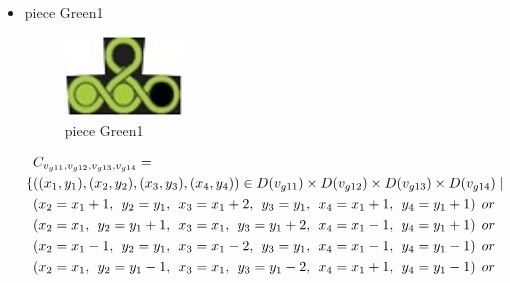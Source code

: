 \begin{appendices}
\begin{itemize}
\begin{align*}
\end{align*}
 \item piece Green1\\
\begin{figure}[H]
    \centering
    \includegraphics[width=0.3\textwidth]{figs/green1.jpg}
    \caption{piece Green1}
\end{figure}
 \begin{align*}
&\Const{g11}{g12}{g13}{g14}=
\\\{&((x_{1},y_{1}),(x_{2},y_{2}),(x_{3},y_{3}),(x_{4},y_{4}))\in \Domain{g11}\times \Domain{g12}\times\Domain{g13}\times\Domain{g14}\mid\\
&(x_{2} = x_{1} + 1,\hspace{1ex}y_{2} = y_{1},\hspace{1ex}x_{3} = x_{1} + 2, \hspace{1ex}y_{3} = y_{1},\hspace{1ex}x_{4} = x_{1}+1,\hspace{1ex}y_{4} = y_{1}+1)\hspace{1ex} or\\
&(x_{2} = x_{1},\hspace{1ex}y_{2} = y_{1}+1,\hspace{1ex}x_{3} = x_{1}, \hspace{1ex}y_{3} = y_{1}+2,\hspace{1ex}x_{4} = x_{1}-1,\hspace{1ex}y_{4} = y_{1}+1)\hspace{1ex} or\\
&(x_{2} = x_{1}-1,\hspace{1ex}y_{2} = y_{1},\hspace{1ex}x_{3} = x_{1}-2,\hspace{1ex} y_{3} = y_{1},\hspace{1ex}x_{4} = x_{1}-1,\hspace{1ex}y_{4} = y_{1}-1)\hspace{1ex} or\\
&(x_{2} = x_{1},\hspace{1ex}y_{2} = y_{1}-1,\hspace{1ex}x_{3} = x_{1}, \hspace{1ex}y_{3} = y_{1}-2,\hspace{1ex}x_{4} = x_{1}+1,\hspace{1ex}y_{4} = y_{1}-1)\hspace{1ex} or\\

\end{align*}
\end{itemize}
\end{appendices}

